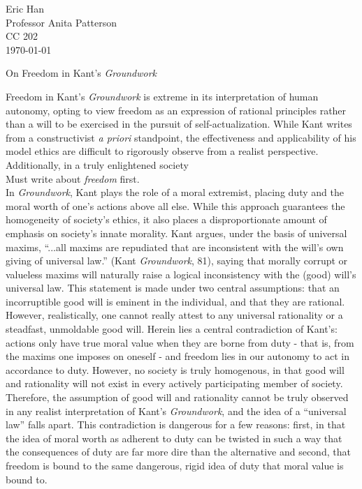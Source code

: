 \documentclass[12pt]{article}
\begin{document}
\begin{flushleft}

Eric Han\\
Professor Anita Patterson\\
CC 202\\
\today \\


\begin{center}
On Freedom in Kant's \textit{Groundwork}
\end{center}


\setlength{\parindent}{0.5in}

Freedom in Kant's \textit{Groundwork} is extreme in its interpretation of human autonomy, opting to view freedom as an expression of rational principles rather than a will to be exercised in the pursuit of self-actualization. While Kant writes from a constructivist \textit{a priori} standpoint, the effectiveness and applicability of his model ethics are difficult to rigorously observe from a realist perspective. Additionally, in a truly enlightened society \\
Must write about \textit{freedom} first.\\
In \textit{Groundwork}, Kant plays the role of a moral extremist, placing duty and the moral worth of one's actions above all else. While this approach guarantees the homogeneity of society's ethics, it also places a disproportionate amount of emphasis on society's innate morality. Kant argues, under the basis of universal maxims, ``...all maxims are repudiated that are inconsistent with the will's own giving of universal law.'' (Kant \textit{Groundwork}, 81), saying that morally corrupt or valueless maxims will naturally raise a logical inconsistency with the (good) will's universal law. This statement is made under two central assumptions: that an incorruptible good will is eminent in the individual, and that they are rational. However, realistically, one cannot really attest to any universal rationality or a steadfast, unmoldable good will. Herein lies a central contradiction of Kant's: actions only have true moral value when they are borne from duty - that is, from the maxims one imposes on oneself - and freedom lies in our autonomy to act in accordance to duty. However, no society is truly homogenous, in that good will and rationality will not exist in every actively participating member of society. Therefore, the assumption of good will and rationality cannot be truly observed in any realist interpretation of Kant's \textit{Groundwork}, and the idea of a ``universal law'' falls apart. This contradiction is dangerous for a few reasons: first, in that the idea of moral worth as adherent to duty can be twisted in such a way that the consequences of duty are far more dire than the alternative and second, that freedom is bound to the same dangerous, rigid idea of duty that moral value is bound to. \\

\end{flushleft}
\end{document}
